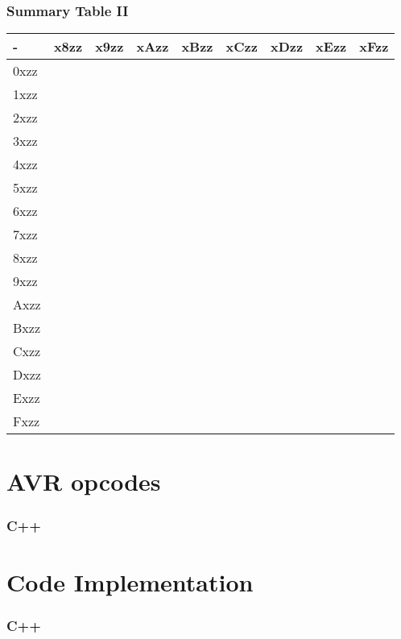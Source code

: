 \documentclass{beamer}
\begin{document}
\begin{frame}
\frametitle{Summary Table II}
\small
\begin{center}
    \begin{tabular}{| l | l | l | l | l | l | l | l | l |}
    \hline
    - & x8zz & x9zz & xAzz & xBzz & xCzz & xDzz & xEzz & xFzz \\    \hline
    0xzz & & & & & & & & \\ \hline
    1xzz & & & & & & & & \\ \hline
    2xzz & & & & & & & & \\ \hline
    3xzz & & & & & & & & \\ \hline
    4xzz & & & & & & & & \\ \hline
    5xzz & & & & & & & & \\ \hline
    6xzz & & & & & & & & \\ \hline
    7xzz & & & & & & & & \\ \hline
    8xzz & & & & & & & & \\ \hline
    9xzz & & & & & & & & \\ \hline
    Axzz & & & & & & & & \\ \hline
    Bxzz & & & & & & & & \\ \hline
    Cxzz & & & & & & & & \\ \hline
    Dxzz & & & & & & & & \\ \hline
    Exzz & & & & & & & & \\ \hline
    Fxzz & & & & & & & & \\ \hline
    \end{tabular}
\end{center}
\end{frame}

\section{AVR opcodes}
\begin{frame}
\frametitle{C++}



\end{frame}

\section{Code Implementation}
\begin{frame}
\frametitle{C++}

\end{frame}
\end{document}
